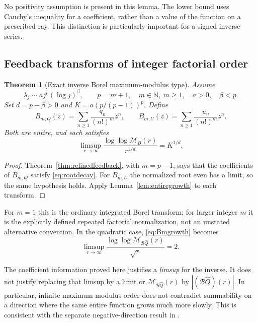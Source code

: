 \documentclass[11pt,a4paper]{article}
\numberwithin{equation}{section}
\newtheorem{theorem}{Theorem}[section]
\theoremstyle{definition}
\theoremstyle{remark}
\newcommand{\N}{\mathbb N}
\newcommand{\B}{\mathcal B}
\newcommand{\Q}{\widehat Q}
\begin{document}
No positivity assumption is present in this lemma. The lower bound uses
Cauchy's inequality for a coefficient, rather than a value of the
function on a prescribed ray. This distinction is particularly important
for a signed inverse series.

\subsection{Feedback transforms of integer factorial order}

\begin{theorem}[Exact inverse Borel maximum-modulus type]
\label{thm:borelgrowth}
Assume
\[
 \lambda_j\sim a j^p(\log j)^\beta,\qquad
 p=m+1,\quad m\in\N,\ m\ge1,\quad a>0,\quad\beta<p.
\]
Set $d=p-\beta>0$ and $K=a(p/(p-1))^p$. Define
\begin{equation}
 B_{m,Q}(z)=\sum_{n\ge1}\frac{q_n}{(n!)^m}z^n,\qquad
 B_{m,U}(z)=\sum_{n\ge1}\frac{u_n}{(n!)^m}z^n.
 \label{eq:Bmq}
\end{equation}
Both are entire, and each satisfies
\begin{equation}
 \limsup_{r\to\infty}
 \frac{\log\log\mathcal M_{B}(r)}{r^{1/d}}
 =K^{1/d}.
 \label{eq:Bmgrowth}
\end{equation}
\end{theorem}
\begin{proof}
Theorem~\ref{thm:refinedfeedback}, with $m=p-1$, says that the
coefficients of $B_{m,Q}$ satisfy \eqref{eq:rootdecay}. For $B_{m,U}$
the normalized root even has a limit, so the same hypothesis holds.
Apply Lemma~\ref{lem:entiregrowth} to each transform.
\end{proof}

For $m=1$ this is the ordinary integrated Borel transform; for larger
integer $m$ it is the explicitly defined repeated factorial
normalization, not an unstated alternative convention. In the quadratic
case, \eqref{eq:Bmgrowth} becomes
\begin{equation}
 \boxed{\displaystyle
 \limsup_{r\to\infty}
 \frac{\log\log\mathcal M_{\B\Q}(r)}{\sqrt r}=2.}
 \label{eq:quadraticgrowth}
\end{equation}

The coefficient information proved here justifies a \emph{limsup} for
the inverse. It does not justify replacing that limsup by a limit or
$\mathcal M_{\B\Q}(r)$ by $|(\B\Q)(r)|$. In particular, infinite
maximum-modulus order does not contradict summability on a direction
where the same entire function grows much more slowly. This is
consistent with the separate negative-direction result in
\cite{negativeray}.
\end{document}
